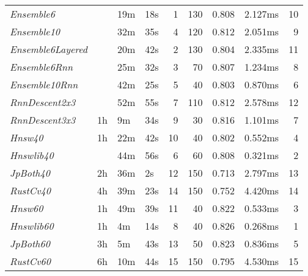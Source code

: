 \begin{tabular}{llllrrrlr}
\toprule
\midrule
\emph{Ensemble6} &  & 19m & 18s & 1 & 130 & 0.808 & 2.127ms & 10 \\
\emph{Ensemble10} &  & 32m & 35s & 4 & 120 & 0.812 & 2.051ms & 9 \\
\emph{Ensemble6Layered} &  & 20m & 42s & 2 & 130 & 0.804 & 2.335ms & 11 \\
\emph{Ensemble6Rnn} &  & 25m & 32s & 3 & 70 & 0.807 & 1.234ms & 8 \\
\emph{Ensemble10Rnn} &  & 42m & 25s & 5 & 40 & 0.803 & 0.870ms & 6 \\
\emph{RnnDescent2x3} &  & 52m & 55s & 7 & 110 & 0.812 & 2.578ms & 12 \\
\emph{RnnDescent3x3} & 1h & 9m & 34s & 9 & 30 & 0.816 & 1.101ms & 7 \\
\emph{Hnsw40} & 1h & 22m & 42s & 10 & 40 & 0.802 & 0.552ms & 4 \\
\emph{Hnswlib40} &  & 44m & 56s & 6 & 60 & 0.808 & 0.321ms & 2 \\
\emph{JpBoth40} & 2h & 36m & 2s & 12 & 150 & 0.713 & 2.797ms & 13 \\
\emph{RustCv40} & 4h & 39m & 23s & 14 & 150 & 0.752 & 4.420ms & 14 \\
\emph{Hnsw60} & 1h & 49m & 39s & 11 & 40 & 0.822 & 0.533ms & 3 \\
\emph{Hnswlib60} & 1h & 4m & 14s & 8 & 40 & 0.826 & 0.268ms & 1 \\
\emph{JpBoth60} & 3h & 5m & 43s & 13 & 50 & 0.823 & 0.836ms & 5 \\
\emph{RustCv60} & 6h & 10m & 44s & 15 & 150 & 0.795 & 4.530ms & 15 \\
\bottomrule
\end{tabular}
